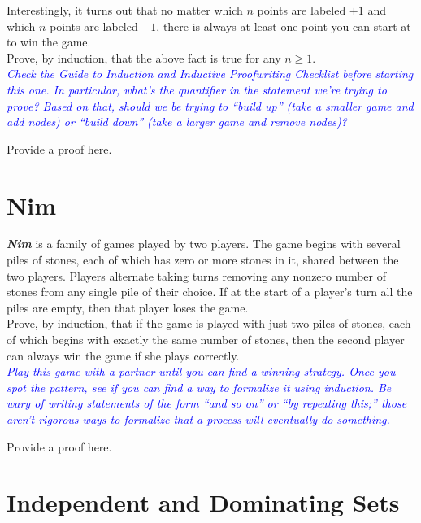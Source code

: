 \documentclass{article}
\renewcommand{\(}{\left(}
\renewcommand{\)}{\right)}
\theoremstyle{plain}
\theoremstyle{plain}
\theoremstyle{definition}
\renewcommand{\emph}[1]{\textit{\textbf{#1}}}
\newcommand{\annotate}[1]{\textit{\textcolor{blue}{#1}}}
\begin{document}
Interestingly, it turns out that no matter which $n$ points are labeled $+1$ and which $n$ points are labeled $-1$,
there is always at least one point you can start at to win the game. \\

Prove, by induction, that the above fact is true for any $n \ge 1$. \\

\annotate{Check the Guide to Induction and Inductive Proofwriting Checklist before starting this one. In particular, what's the quantifier in the statement we're trying to prove? Based on that, should we be trying to ``build up'' (take a smaller game and add nodes) or ``build down'' (take a larger game and remove nodes)?}

\begin{shaded}
Provide a proof here.
\end{shaded}

\pagebreak

\section{Nim}

\emph{Nim} is a family of games played by two players. The game begins with several piles of stones, each of which has zero or more stones in it, shared between the two players. Players alternate taking turns removing any nonzero number of stones from any single pile of their choice. If at the start of a player's turn all the piles are empty, then that player loses the game. \\

Prove, by induction, that if the game is played with just two piles of stones, each of which begins with exactly the same number of stones, then the second player can always win the game if she plays correctly. \\

\annotate{Play this game with a partner until you can find a winning strategy. Once you spot the pattern, see if you can find a way to formalize it using induction. Be wary of writing statements of the form ``and so on'' or ``by repeating this;'' those aren't rigorous ways to formalize that a process will eventually do something.}

\begin{shaded}
Provide a proof here.
\end{shaded}

\pagebreak

\section{Independent and Dominating Sets}
\end{document}
